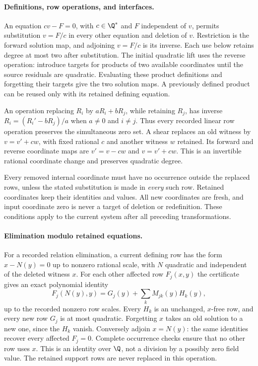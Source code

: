 \paragraph{Definitions, row operations, and interfaces.}
An equation $cv-F=0$, with $c\in\Q^*$ and $F$ independent of $v$,
permits substitution $v=F/c$ in every other equation and deletion of $v$.
Restriction is the forward solution map, and adjoining $v=F/c$ is its
inverse. Each use below retains degree at most two after substitution.
The initial quadratic lift uses the reverse operation: introduce targets
for products of two available coordinates until the source residuals are
quadratic. Evaluating these product definitions and forgetting their
targets give the two solution maps. A previously defined product can be
reused only with its retained defining equation.

An operation replacing $R_i$ by $aR_i+bR_j$, while retaining $R_j$,
has inverse $R_i=(R_i'-bR_j)/a$ when $a\ne0$ and $i\ne j$.
Thus every recorded linear row operation preserves the simultaneous zero
set. A shear replaces an old witness by $v=v'+cw$, with fixed rational
$c$ and another witness $w$ retained. Its forward and reverse coordinate
maps are $v'=v-cw$ and $v=v'+cw$. This is an invertible rational coordinate
change and preserves quadratic degree.

Every removed internal coordinate must have no occurrence outside the
replaced rows, unless the stated substitution is made in \emph{every}
such row. Retained coordinates keep their identities and values. All new
coordinates are fresh, and input coordinate zero is never a target of
deletion or redefinition. These conditions apply to the current system
after all preceding transformations.
\paragraph{Elimination modulo retained equations.}
For a recorded relation elimination, a current defining row has the form
$x-N(y)=0$ up to nonzero rational scale, with $N$ quadratic and independent
of the deleted witness $x$. For each other affected row $F_j(x,y)$ the
certificate gives an exact polynomial identity
\[
 F_j(N(y),y)=G_j(y)+\sum_k M_{jk}(y)H_k(y),
\]
up to the recorded nonzero row scales. Every $H_k$ is an unchanged,
$x$-free row, and every new row $G_j$ is at most quadratic. Forgetting
$x$ takes an old solution to a new one, since the $H_k$ vanish.
Conversely adjoin $x=N(y)$: the same identities recover every affected
$F_j=0$. Complete occurrence checks ensure that no other row uses $x$.
This is an identity over $\Q$, not a division by a possibly zero field
value. The retained support rows are never replaced in this operation.

